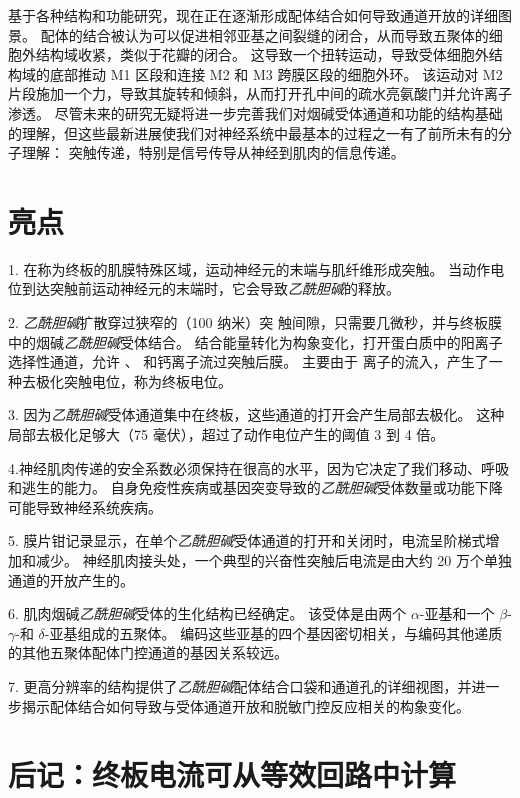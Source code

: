 基于各种结构和功能研究，现在正在逐渐形成配体结合如何导致通道开放的详细图景。
配体的结合被认为可以促进相邻亚基之间裂缝的闭合，从而导致五聚体的细胞外结构域收紧，类似于花瓣的闭合。
这导致一个扭转运动，导致受体细胞外结构域的底部推动 M1 区段和连接 M2 和 M3 跨膜区段的细胞外环。
该运动对 M2 片段施加一个力，导致其旋转和倾斜，从而打开孔中间的疏水亮氨酸门并允许离子渗透。
尽管未来的研究无疑将进一步完善我们对烟碱受体通道和功能的结构基础的理解，但这些最新进展使我们对神经系统中最基本的过程之一有了前所未有的分子理解：
突触传递，特别是信号传导从神经到肌肉的信息传递。



\section{亮点}

1. 在称为终板的肌膜特殊区域，运动神经元的末端与肌纤维形成突触。
当动作电位到达突触前运动神经元的末端时，它会导致\textit{乙酰胆碱}的释放。 


2. \textit{乙酰胆碱}扩散穿过狭窄的（100 纳米）突 触间隙，只需要几微秒，并与终板膜中的烟碱\textit{乙酰胆碱}受体结合。
结合能量转化为构象变化，打开蛋白质中的阳离子选择性通道，允许 、 和钙离子流过突触后膜。
主要由于  离子的流入，产生了一种去极化突触电位，称为终板电位。 


3. 因为\textit{乙酰胆碱}受体通道集中在终板，这些通道的打开会产生局部去极化。
这种局部去极化足够大（75 毫伏），超过了动作电位产生的阈值 3 到 4 倍。


4.神经肌肉传递的安全系数必须保持在很高的水平，因为它决定了我们移动、呼吸和逃生的能力。
自身免疫性疾病或基因突变导致的\textit{乙酰胆碱}受体数量或功能下降可能导致神经系统疾病。 


5. 膜片钳记录显示，在单个\textit{乙酰胆碱}受体通道的打开和关闭时，电流呈阶梯式增加和减少。
神经肌肉接头处，一个典型的兴奋性突触后电流是由大约 20 万个单独通道的开放产生的。 


6. 肌肉烟碱\textit{乙酰胆碱}受体的生化结构已经确定。
该受体是由两个 $\alpha$-亚基和一个 $\beta$-$\gamma$-和 $\delta$-亚基组成的五聚体。
编码这些亚基的四个基因密切相关，与编码其他递质的其他五聚体配体门控通道的基因关系较远。 


7. 更高分辨率的结构提供了\textit{乙酰胆碱}配体结合口袋和通道孔的详细视图，并进一步揭示配体结合如何导致与受体通道开放和脱敏门控反应相关的构象变化。


\section{后记：终板电流可从等效回路中计算}

